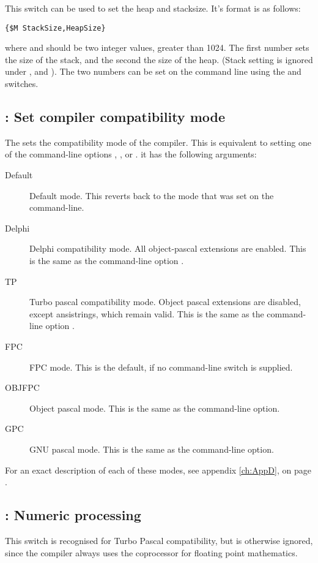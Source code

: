 This switch can be used to set the heap and stacksize. It's format is as
follows:
\begin{verbatim}
{$M StackSize,HeapSize}
\end{verbatim}
where  and  should be two integer values,
greater than 1024. The first number sets the size of the stack, and the
second the size of the heap. (Stack setting is ignored under \linux, \netbsd and \freebsd).
The two numbers can be set on the command line using the 
and  switches.

\subsection{ : Set compiler compatibility mode}

The  sets the compatibility mode of the compiler. This
is equivalent to setting one of the command-line options ,
,  or . it has the following arguments:
\begin{description}
\item[Default] Default mode. This reverts back to the mode that was set on
the command-line.
\item[Delphi] Delphi compatibility mode. All object-pascal extensions are
enabled. This is the same as the command-line option .
\item[TP] Turbo pascal compatibility mode. Object pascal extensions are
disabled, except ansistrings, which remain valid.
This is the same as the command-line option .
\item[FPC] FPC mode. This is the default, if no command-line switch is
supplied.
\item[OBJFPC] Object pascal mode. This is the same as the 
command-line option.
\item[GPC] GNU pascal mode. This is the same as the  command-line
option.
\end{description}

For an exact description of each of these modes, see appendix \ref{ch:AppD},
on page \pageref{ch:AppD}.

\subsection{ : Numeric processing }

This switch is recognised for Turbo Pascal compatibility, but is otherwise
ignored, since the compiler always uses the coprocessor for floating point
mathematics.

